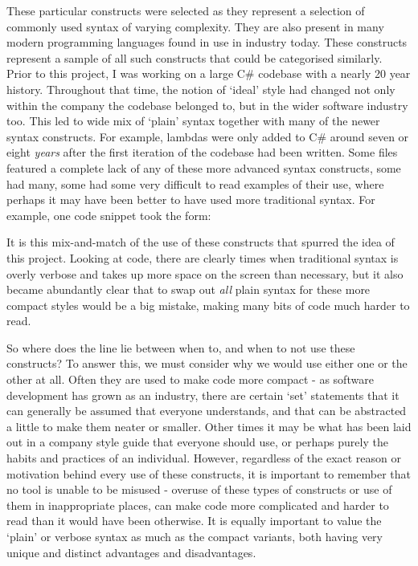 \documentclass{article}
\begin{document}
        These particular constructs were selected as they represent a selection of commonly used syntax of varying complexity. They are also present in many modern programming languages found in use in industry today. These constructs represent a sample of all such constructs that could be categorised similarly.
        \\
        Prior to this project, I was working on a large C\# codebase with a nearly 20 year history. Throughout that time, the notion of `ideal' style had changed not only within the company the codebase belonged to, but in the wider software industry too. This led to wide mix of `plain' syntax together with many of the newer syntax constructs. For example, lambdas were only added to C\# around seven or eight \emph{years} after the first iteration of the codebase had been written. Some files featured a complete lack of any of these more advanced syntax constructs, some had many, some had some very difficult to read examples of their use, where perhaps it may have been better to have used more traditional syntax. For example, one code snippet took the form:\newline

        \newline
        \indent\indent{}\newline
        \indent\indent{}\newline
        \indent\indent{}\newline
        

        It is this mix-and-match of the use of these constructs that spurred the idea of this project. Looking at code, there are clearly times when traditional syntax is overly verbose and takes up more space on the screen than necessary, but it also became abundantly clear that to swap out \emph{all} plain syntax for these more compact styles would be a big mistake, making many bits of code much harder to read.

        So where does the line lie between when to, and when to not use these constructs? To answer this, we must consider why we would use either one or the other at all. Often they are used to make code more compact - as software development has grown as an industry, there are certain `set' statements that it can generally be assumed that everyone understands, and that can be abstracted a little to make them neater or smaller. Other times it may be what has been laid out in a company style guide that everyone should use, or perhaps purely the habits and practices of an individual. However, regardless of the exact reason or motivation behind every use of these constructs, it is important to remember that no tool is unable to be misused - overuse of these types of constructs or use of them in inappropriate places, can make code more complicated and harder to read than it would have been otherwise. It is equally important to value the `plain' or verbose syntax as much as the compact variants, both having very unique and distinct advantages and disadvantages.
        \\
\end{document}
